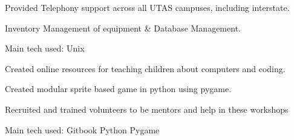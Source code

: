 \documentclass[a4paper]{deedy-resume} %
\begin{document}
\begin{minipage}[t]{0.66\textwidth}
\sectionspace %



\begin{tightitemize}
\item Provided Telephony support across all UTAS campuses, including interstate.
\item Inventory Management of equipment \& Database Management.
\end{tightitemize}
Main tech used: \textbullet{} Unix

\sectionspace %



\begin{tightitemize}
\item Created online resources for teaching children about computers and coding.
\item Created modular sprite based game in python using pygame. %
\item Recruited and trained volunteers to be mentors and help in these workshops \\
\end{tightitemize}
Main tech used: \textbullet{} Gitbook \textbullet{} Python \textbullet{} Pygame

\sectionspace %

\sectionspace

\end{minipage}
\end{document}
